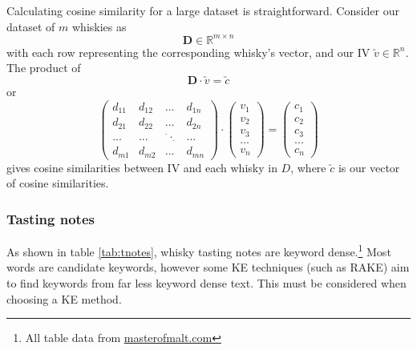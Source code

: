 Calculating cosine similarity for a large dataset is straightforward.
Consider our dataset of $m$ whiskies as
\begin{equation}
    \textbf{D} \in \mathbb{R}^{m \times n}
\end{equation}
with each row representing the corresponding whisky's vector, and our IV $\utilde{v} \in \mathbb{R}^{n}$.
The product of 
\begin{equation}
    \textbf{D} \cdot \utilde{v} = \utilde{c}    
\end{equation}
or 
\begin{equation}\label{eqn:cossim}
    \begin{pmatrix}
        d_{11} & d_{12} & ... & d_{1n}\\
        d_{21} & d_{22} & ... & d_{2n}\\
        ...    & ...    & ^{\cdot}\cdot _{\cdot} & ...   \\
        d_{m1} & d_{m2} & ... & d_{mn}
    \end{pmatrix}
    \cdot
    \begin{pmatrix}
        v_1 \\ v_2 \\ v_3 \\ ... \\ v_n
    \end{pmatrix}
    =
    \begin{pmatrix}
        c_1 \\ c_2 \\ c_3 \\ ... \\ c_n
    \end{pmatrix}
\end{equation}
gives cosine similarities between IV and each whisky in $D$, where $\utilde{c}$ is our vector of cosine similarities.




\subsubsection{Tasting notes}\label{ssec:tnotes}
As shown in table \ref{tab:tnotes}, whisky tasting notes are keyword dense.\footnote{All table
data from \href{http://masterofmalt.com/}{masterofmalt.com}}
Most words are candidate keywords, however some KE techniques (such as RAKE) aim to 
find keywords from far less keyword dense text. This must be considered when choosing a KE method.

